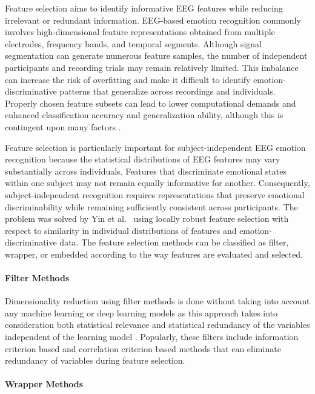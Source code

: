 \documentclass[ASNA,twocolumn]{USG}
\begin{document}
Feature selection aims to identify informative EEG features while reducing irrelevant or redundant information. EEG-based emotion recognition commonly involves high-dimensional feature representations obtained from multiple electrodes, frequency bands, and temporal segments. Although signal segmentation can generate numerous feature samples, the number of independent participants and recording trials may remain relatively limited. This imbalance can increase the risk of overfitting and make it difficult to identify emotion-discriminative patterns that generalize across recordings and individuals. Properly chosen feature subsets can lead to lower computational demands and enhanced classification accuracy and generalization ability, although this is contingent upon many factors \cite{hamzah2024eeg}.

Feature selection is particularly important for subject-independent EEG emotion recognition because the statistical distributions of EEG features may vary substantially across individuals. Features that discriminate emotional states within one subject may not remain equally informative for another. Consequently, subject-independent recognition requires representations that preserve emotional discriminability while remaining sufficiently consistent across participants. The problem was solved by Yin et al.~\cite{yin2020locally} using locally robust feature selection with respect to similarity in individual distributions of features and emotion-discriminative data. The feature selection methods can be classified as filter, wrapper, or embedded according to the way features are evaluated and selected.

\paragraph{Filter Methods}

Dimensionality reduction using filter methods is done without taking into account any machine learning or deep learning models as this approach takes into consideration both statistical relevance and statistical redundancy of the variables independent of the learning model \cite{chakladar2018eeg}. Popularly, these filters include information criterion based and correlation criterion based methods that can eliminate redundancy of variables during feature selection.

\paragraph{Wrapper Methods}
\end{document}
